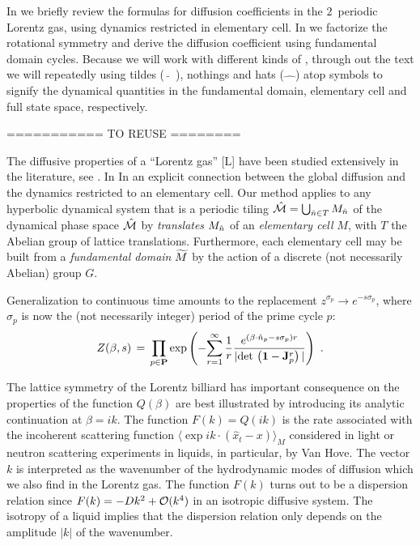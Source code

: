 
In  we briefly review the formulas for diffusion
coefficients in the $2$\dmn\ periodic Lorentz gas, using dynamics
restricted in elementary cell. In we
factorize the rotational symmetry and derive the diffusion coefficient
using fundamental domain cycles. Because we will work with different
kinds of \statesp, through out the text we will repeatedly using tildes
($\tilde{\quad}$), nothings and hats ($\hat{\quad}$) atop symbols to
signify the dynamical quantities in the fundamental domain, elementary
cell and full state space, respectively.


=========== TO REUSE ========


The diffusive properties of a ``Lorentz gas'' [L]
have been studied extensively in the literature,
see .
In In   an explicit
connection between the global diffusion and the dynamics restricted to
an elementary cell.
Our method applies to any  hyperbolic dynamical system that is
a periodic tiling $\hat {{\cal M}}=\bigcup_{ \hat n \in T} M_{
\hat n}$
of the dynamical phase space $\hat {{\cal M}}$ by {\sl translates}
$M_{\hat n}$
of an {\sl elementary cell} $M$, with $T$ the Abelian group of lattice
translations.
Furthermore, each elementary cell may be built from a
{\sl fundamental domain}
${\widetilde M}$
by the action of a discrete (not necessarily Abelian) group $G$.

                                                            \toCB
Generalization to continuous time amounts to the replacement
$ z^{\sigma_p} \rightarrow e^{-s \sigma_p} $,
where $\sigma_p$ is now the (not necessarily integer)
period of the prime cycle $p$:
$$
Z(\beta,s)\,=\,\prod_{p\in\PP} \exp \left( - {
 \sum_{r=1}^\infty {1 \over r}
 { e^{(\beta \cdot \hn_p- s \sigma_p) r } %
 \over { | \det \left( {\bf 1}-{\bf J}_p^{r} \right) | } }
 } \right)
\,\, .
$$

The lattice symmetry of the Lorentz billiard has important consequence on
the properties of the function $Q(\beta)$ are best illustrated by introducing
its analytic continuation at $\beta = i k$.  The function $F(k)=Q(ik)$ is the
rate associated with the incoherent scattering function $\langle \exp i k
\cdot (\hat x_t - x) \rangle_M$ considered in light or
neutron scattering experiments in liquids, in particular, by Van Hove.
The vector $k$ is interpreted as the wavenumber of the hydrodynamic modes of
diffusion which we also find in the Lorentz gas.  The function $F(k)$ turns
out to be a dispersion relation since $F(k)=-D k^2 + {\cal O}(k^4)$ in an
isotropic diffusive system.  The isotropy of a liquid implies that the
dispersion relation only depends on the amplitude $\vert k\vert$ of the
wavenumber.


